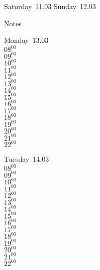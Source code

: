 \documentclass[11pt,a4paper]{book}\usepackage[]{graphicx}\usepackage[]{color}
\begin{document}
\begin{weekendbox}
  Saturday~11.03
  \tcblower
  Sunday~12.03
\end{weekendbox} %
\begin{notebox}
  Notes
\end{notebox}
\clearpage
\begin{headerbox}
\end{headerbox}
\begin{weekdaybox}
  Monday~13.03\\
  { 
  \vfill
  $08^{00}$\\
$09^{00}$\\
$10^{00}$\\
$11^{00}$\\
$12^{00}$\\
$13^{00}$\\
$14^{00}$\\
$15^{00}$\\
$16^{00}$\\
$17^{00}$\\
$18^{00}$\\
$19^{00}$\\
$20^{00}$\\
$21^{00}$\\
$22^{00}$\\
  }
\end{weekdaybox}
\begin{weekdaybox}
  Tuesday~14.03\\
  { 
  \vfill
  $08^{00}$\\
$09^{00}$\\
$10^{00}$\\
$11^{00}$\\
$12^{00}$\\
$13^{00}$\\
$14^{00}$\\
$15^{00}$\\
$16^{00}$\\
$17^{00}$\\
$18^{00}$\\
$19^{00}$\\
$20^{00}$\\
$21^{00}$\\
$22^{00}$\\
  }
\end{weekdaybox}
\end{document}
